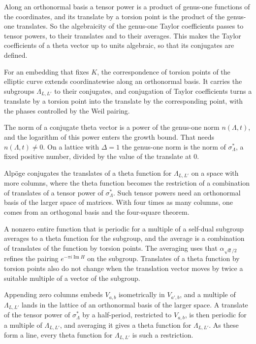Along an orthonormal basis a tensor power is a product of genus-one functions of the coordinates, and
its translate by a torsion point is the product of the genus-one translates. So the algebraicity of the
genus-one Taylor coefficients passes to tensor powers, to their translates and to their averages. This
makes the Taylor coefficients of a theta vector up to units algebraic, so that its conjugates are
defined.

For an embedding that fixes $K$, the correspondence of torsion points of the elliptic curve extends
coordinatewise along an orthonormal basis. It carries the subgroups $\Lambda_{L,L'}$ to their conjugates,
and conjugation of Taylor coefficients turns a translate by a torsion point into the translate by the
corresponding point, with the phases controlled by the Weil pairing.

The norm of a conjugate theta vector is a power of the genus-one norm $n(\Lambda,t)$, and the
logarithm of this power enters the growth bound. That needs $n(\Lambda,t)\ne0$. On a lattice with
$\Delta=1$ the genus-one norm is the norm of $\sigma^*_\Lambda$, a fixed positive number, divided by the
value of the translate at $0$.

Alpöge conjugates the translates of a theta function for $\Lambda_{L,L'}$ on a space with more columns, where
the theta function becomes the restriction of a combination of translates of a tensor power of
$\sigma^*_\Lambda$. Such tensor powers need an orthonormal basis of the larger space of matrices. With four
times as many columns, one comes from an orthogonal basis and the four-square theorem.

A nonzero entire function that is periodic for a multiple of a self-dual subgroup averages to a theta
function for the subgroup, and the average is a combination of translates of the function by torsion
points. The averaging uses that $\alpha_{\sqrt d/2}$ refines the pairing $e^{-\pi i\operatorname{Im}H}$ on the
subgroup. Translates of a theta function by torsion points also do not change when the translation vector
moves by twice a suitable multiple of a vector of the subgroup.

Appending zero columns embeds $V_{a,b}$ isometrically in $V_{a',b}$, and a multiple of $\Lambda_{L,L'}$ lands
in the lattice of an orthonormal basis of the larger space. A translate of the tensor power of
$\sigma^*_\Lambda$ by a half-period, restricted to $V_{a,b}$, is then periodic for a multiple of
$\Lambda_{L,L'}$, and averaging it gives a theta function for $\Lambda_{L,L'}$. As these form a line, every
theta function for $\Lambda_{L,L'}$ is such a restriction.

